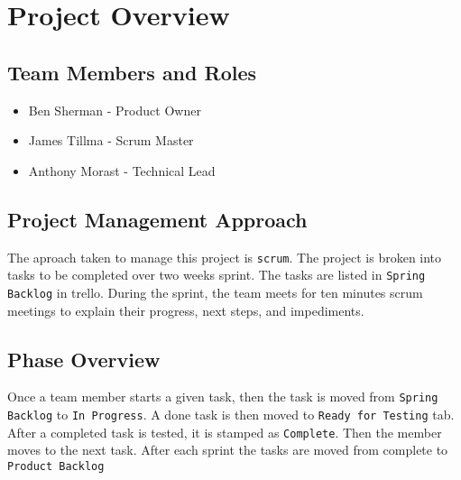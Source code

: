 

\chapter{Project Overview}



\section{Team Members and Roles}

\begin{itemize}
  \item Ben Sherman - Product Owner
  \item James Tillma - Scrum Master
  \item Anthony Morast - Technical Lead  
\end{itemize}


\section{Project  Management Approach}
The aproach taken to manage this project is {\tt scrum}. The project is broken into tasks to be completed over two weeks sprint. The tasks are listed in {\tt Spring Backlog} in trello. During the sprint, the team meets for ten minutes scrum meetings to explain their progress, next steps, and impediments. 


\section{Phase  Overview}
Once a team member starts a given task, then the task is moved from {\tt Spring Backlog} to {\tt In Progress}. A done task is then moved to {\tt Ready for Testing} tab. After a completed task is tested, it is stamped as {\tt Complete}. Then the member moves to the next task. After each sprint the tasks are moved from complete to {\tt Product Backlog}

 
